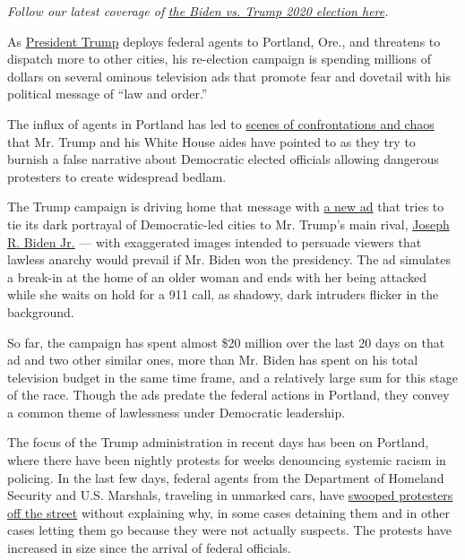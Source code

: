 \emph{Follow our latest coverage of}
\href{https://www.nytimes.com/2020/07/31/us/elections/biden-vs-trump.html}{\emph{the
Biden vs. Trump 2020 election here}}\emph{.}

As
\href{https://www.nytimes.com/interactive/2020/us/elections/donald-trump.html}{President
Trump} deploys federal agents to Portland, Ore., and threatens to
dispatch more to other cities, his re-election campaign is spending
millions of dollars on several ominous television ads that promote fear
and dovetail with his political message of ``law and order.''

The influx of agents in Portland has led to
\href{https://www.nytimes.com/2020/07/21/us/portland-protests.html}{scenes
of confrontations and chaos} that Mr. Trump and his White House aides
have pointed to as they try to burnish a false narrative about
Democratic elected officials allowing dangerous protesters to create
widespread bedlam.

The Trump campaign is driving home that message with
\href{https://www.youtube.com/watch?v=moZOrq0qL3Q\&feature=youtu.be}{a
new ad} that tries to tie its dark portrayal of Democratic-led cities to
Mr. Trump's main rival,
\href{https://www.nytimes.com/interactive/2020/us/elections/joe-biden.html}{Joseph
R. Biden Jr.} --- with exaggerated images intended to persuade viewers
that lawless anarchy would prevail if Mr. Biden won the presidency. The
ad simulates a break-in at the home of an older woman and ends with her
being attacked while she waits on hold for a 911 call, as shadowy, dark
intruders flicker in the background.

So far, the campaign has spent almost \$20 million over the last 20 days
on that ad and two other similar ones, more than Mr. Biden has spent on
his total television budget in the same time frame, and a relatively
large sum for this stage of the race. Though the ads predate the federal
actions in Portland, they convey a common theme of lawlessness under
Democratic leadership.

The focus of the Trump administration in recent days has been on
Portland, where there have been nightly protests for weeks denouncing
systemic racism in policing. In the last few days, federal agents from
the Department of Homeland Security and U.S. Marshals, traveling in
unmarked cars, have
\href{https://www.nytimes.com/2020/07/17/us/portland-protests.html}{swooped
protesters off the street} without explaining why, in some cases
detaining them and in other cases letting them go because they were not
actually suspects. The protests have increased in size since the arrival
of federal officials.

